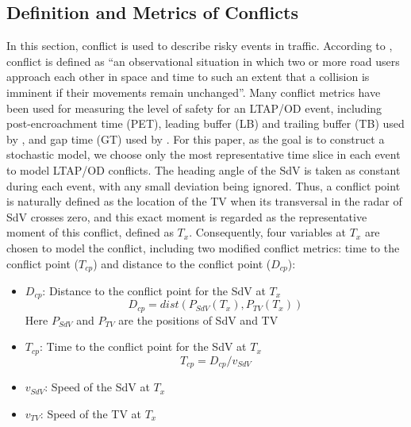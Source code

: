 \documentclass[letterpaper, 10 pt, conference]{ieeeconf}
\begin{document}
\subsection{Definition and Metrics of Conflicts}

In this section, conflict is used to describe risky events in traffic. According to \cite{Tarko2012b}, conflict is defined as “an observational situation in which two or more road users approach each other in space and time to such an extent that a collision is imminent if their movements remain unchanged”. Many conflict metrics have been used for measuring the level of safety for an LTAP/OD event, including post-encroachment time (PET), leading buffer (LB) and trailing buffer (TB) used by \cite{nobukawa2011model}, and gap time (GT) used by \cite{Misener2007CaliforniaReport}. For this paper, as the goal is to construct a stochastic model, we choose only the most representative time slice in each event to model LTAP/OD conflicts. The heading angle of the SdV is taken as constant during each event, with any small deviation being ignored. Thus, a conflict point is naturally defined as the location of the TV when its transversal in the radar of SdV crosses zero, and this exact moment is regarded as the representative moment of this conflict, defined as $T_x$. Consequently, four variables at $T_x$ are chosen to model the conflict, including two modified conflict metrics: time to the conflict point ($T_{cp}$) and distance to the conflict point ($D_{cp}$):
  \begin{itemize}
  \item $D_{cp}$: Distance to the conflict point for the SdV at $T_x$
  \begin{equation}
  D_{cp}=dist(P_{SdV}(T_x),P_{TV}(T_x))
  \end{equation} Here $P_{SdV}$ and $P_{TV}$ are the positions of SdV and TV
  \item $T_{cp}$: Time to the conflict point for the SdV at $T_x$ 
  \begin{equation}
  T_{cp}=D_{cp}/v_{SdV}
  \end{equation}
  \item $v_{SdV}$: Speed of the SdV at $T_x$
  \item $v_{TV}$: Speed of the TV at $T_x$
  \end{itemize}
\end{document}
